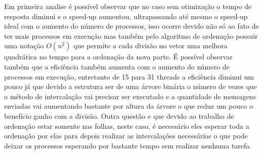 \documentclass[9pt]{IEEEtran}
\begin{document}
	Em primeira analise é possível observar que no caso sem otimização o tempo
	de resposta diminui e o speed-up aumentou, ultrapassando até mesmo o
	speed-up ideal com o aumento do número de processos, isso ocorre devido não
	só ao fato de ter mais processos em execução mas também pelo algoritmo de
	ordenação possuir uma notação $O(n^2)$ que permite a cada divisão no vetor
	uma melhora quadrática no tempo para a ordenação da nova parte. É possível
	observar também que a eficiência também aumenta com o aumento do número de
	processos em execução, entretanto de 15 para 31 threads a eficiência diminui
	um pouco já que devido a estrutura ser de uma árvore binária o número de
	vezes que o método de intercalação vai precisar ser executado e a quantidade
	de mensagens enviadas vai aumentando bastante por altura da árvore o que
	reduz um pouco o benefício ganho com a divisão. Outra questão e que devido
	ao trabalho de ordenação estar somente nas folhas, neste caso, é necessário
	eles esperar toda a ordenação por elas para depois realizar as intercalações
	necessárias o que pode deixar os processos esperando por bastante tempo sem
	realizar nenhuma tarefa.

	\begin{table}[H]
		\centering
		\caption{Resultados obtidos para 1000000 e tempo para 100000}
		\label{result_table}
	\end{table}
\end{document}
